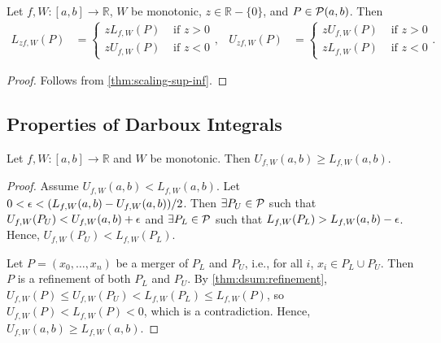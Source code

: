 \documentclass[a4paper,12pt,fleqn]{article}
\begin{document}
\begin{lemma}
\label{thm:dsum:scaling}
Let $f, W: [a, b] \to \mathbb{R}$, $W$ be monotonic,
$z \in \mathbb{R} - \{0\}$, and $P \in \mathcal{P}(a, b)$. Then
\begin{align*}
L_{zf,W}(P) &= \begin{cases}
    zL_{f,W}(P) & \text{ if } z > 0
    \\ zU_{f,W}(P) & \text{ if } z < 0
\end{cases},
& U_{zf,W}(P) &= \begin{cases}
    zU_{f,W}(P) & \text{ if } z > 0
    \\ zL_{f,W}(P) & \text{ if } z < 0
\end{cases}.
\end{align*}
\end{lemma}
\begin{proof}
Follows from \cref{thm:scaling-sup-inf}.
\end{proof}

\subsection{Properties of Darboux Integrals}

\begin{lemma}
\label{thm:dint:l-le-u}
Let $f, W: [a, b] \to \mathbb{R}$ and $W$ be monotonic.
Then $U_{f,W}(a, b) \ge L_{f,W}(a, b)$.
\end{lemma}
\begin{proof}
Assume $U_{f,W}(a, b) < L_{f,W}(a, b)$. Let $0 < \epsilon < (L_{f,W}(a, b) - U_{f,W}(a, b)) / 2$.
Then $\exists P_U \in \mathcal{P}$ such that $U_{f,W}(P_U) < U_{f,W}(a, b) + \epsilon$
and $\exists P_L \in \mathcal{P}$ such that $L_{f,W}(P_L) > L_{f,W}(a, b) - \epsilon$.
Hence, $U_{f,W}(P_U) < L_{f,W}(P_L)$.

Let $P = (x_0, \ldots, x_n)$ be a merger of $P_L$ and $P_U$,
i.e., for all $i$, $x_i \in P_L \cup P_U$.
Then $P$ is a refinement of both $P_L$ and $P_U$.
By \cref{thm:dsum:refinement}, $U_{f,W}(P) \le U_{f,W}(P_U) < L_{f,W}(P_L) \le L_{f,W}(P)$,
so $U_{f,W}(P) < L_{f,W}(P) < 0$, which is a contradiction.
Hence, $U_{f,W}(a, b) \ge L_{f,W}(a, b)$.
\end{proof}
\end{document}

